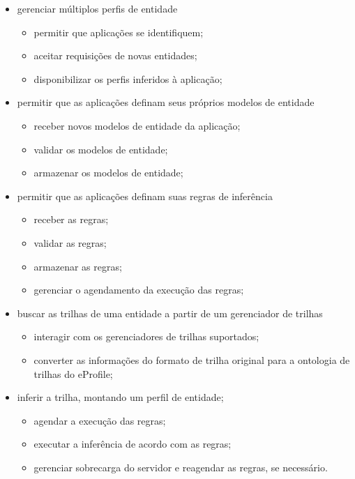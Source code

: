\begin{itemize}
  \item gerenciar múltiplos perfis de entidade
  \begin{itemize}
    \item permitir que aplicações se identifiquem;
    \item aceitar requisições de novas entidades;
    \item disponibilizar os perfis inferidos à aplicação;
  \end{itemize}
  \item permitir que as aplicações definam seus próprios modelos de entidade
  \begin{itemize}
    \item receber novos modelos de entidade da aplicação;
    \item validar os modelos de entidade;
    \item armazenar os modelos de entidade;
  \end{itemize}
  \item permitir que as aplicações definam suas regras de inferência
  \begin{itemize}
    \item receber as regras;
    \item validar as regras;
    \item armazenar as regras;
    \item gerenciar o agendamento da execução das regras;
  \end{itemize}
  \item buscar as trilhas de uma entidade a partir de um gerenciador de trilhas
  \begin{itemize}
    \item interagir com os gerenciadores de trilhas suportados;
    \item converter as informações do formato de trilha original para a ontologia de trilhas do eProfile;
  \end{itemize}
  \item inferir a trilha, montando um perfil de entidade;
  \begin{itemize}
    \item agendar a execução das regras;
    \item executar a inferência de acordo com as regras;
    \item gerenciar sobrecarga do servidor e reagendar as regras, se necessário.
  \end{itemize}
\end{itemize}

